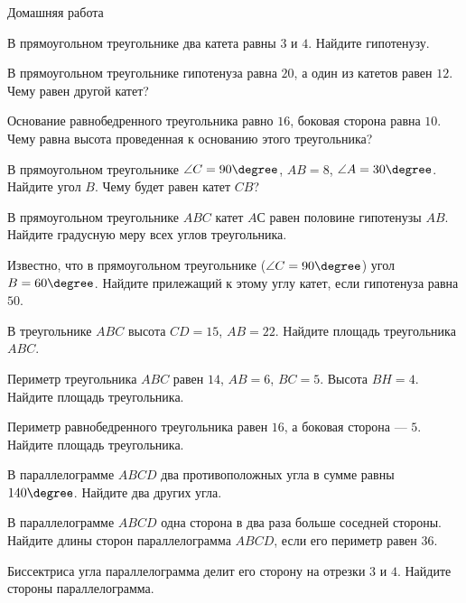 \begin{homework}[number=1]
		\begin{listofex}
			\item Домашняя работа
		\end{listofex}
\end{homework}

\begin{class}[number=2]
	\begin{listofex}
		\item В прямоугольном треугольнике два катета равны \( 3 \) и \(  4 \). Найдите гипотенузу.
		\item В прямоугольном треугольнике гипотенуза равна \( 20 \), а один из катетов равен \( 12 \). Чему равен другой катет?
		\item Основание равнобедренного треугольника равно \( 16 \), боковая сторона равна \( 10 \). Чему равна высота проведенная к основанию этого треугольника?
		\item В прямоугольном треугольнике \( \angle C=90\degree \), \( AB=8 \), \( \angle A=30\degree \). Найдите угол \( B \). Чему будет равен катет \( CB \)?
		\item В прямоугольном треугольнике \( ABC \) катет \( AС \) равен половине гипотенузы \( AB \). Найдите градусную меру всех углов треугольника.
		\item Известно, что в прямоугольном треугольнике (\( \angle C=90\degree \)) угол \( B=60\degree \). Найдите прилежащий к этому углу катет, если гипотенуза равна \( 50 \).
		\item В треугольнике \( ABC \) высота \( CD=15 \), \( AB=22 \). Найдите площадь треугольника \( ABC \).
		\item Периметр треугольника \( ABC \) равен \( 14 \), \( AB=6 \), \( BC=5 \). Высота \( BH=4 \). Найдите площадь треугольника.
		\item Периметр равнобедренного треугольника равен \( 16 \), а боковая сторона --- \( 5 \). Найдите площадь треугольника.
		\item В параллелограмме \( ABCD \) два противоположных угла в сумме равны \( 140\degree \). Найдите два других угла.
		\item В параллелограмме \( ABCD \) одна сторона в два раза больше соседней стороны. Найдите длины сторон параллелограмма \( ABCD \), если его периметр равен \( 36 \).
		\item Биссектриса угла параллелограмма делит его сторону на отрезки \( 3 \) и \( 4 \). Найдите стороны параллелограмма.

\end{listofex}
\end{class}
